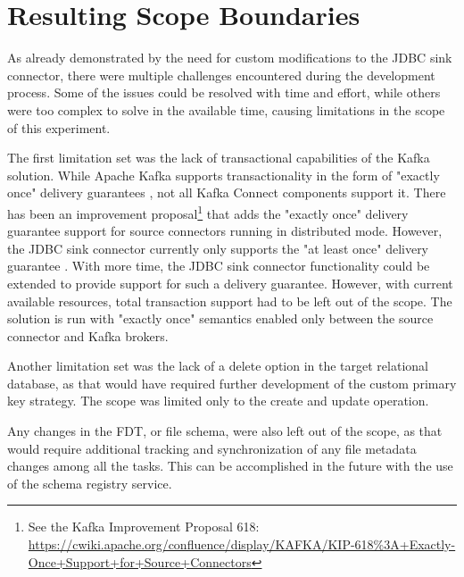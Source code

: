 
\section{Resulting Scope Boundaries}
\label{ch04:pipelinedevelopment:solutionlimitations}
As already demonstrated by the need for custom modifications to the \ac{JDBC} sink connector, there were multiple challenges encountered during the development process. Some of the issues could be resolved with time and effort, while others were too complex to solve in the available time, causing limitations in the scope of this experiment.

The first limitation set was the lack of transactional capabilities of the Kafka solution. While Apache Kafka supports transactionality in the form of "exactly once" delivery guarantees \cite{kafkadocumentation}, not all Kafka Connect components support it. There has been an improvement proposal\footnote{See the Kafka Improvement Proposal 618: \url{https://cwiki.apache.org/confluence/display/KAFKA/KIP-618\%3A+Exactly-Once+Support+for+Source+Connectors}} that adds the "exactly once" delivery guarantee support for source connectors running in distributed mode. However, the \ac{JDBC} sink connector currently only supports the "at least once" delivery guarantee \cite{jdbcsinkdocumentation}. With more time, the \ac{JDBC} sink connector functionality could be extended to provide support for such a delivery guarantee. However, with current available resources, total transaction support had to be left out of the scope. The solution is run with "exactly once" semantics enabled only between the source connector and Kafka brokers.

Another limitation set was the lack of a delete option in the target relational database, as that would have required further development of the custom primary key strategy. The scope was limited only to the create and update operation.

Any changes in the \ac{FDT}, or file schema, were also left out of the scope, as that would require additional tracking and synchronization of any file metadata changes among all the tasks. This can be accomplished in the future with the use of the schema registry service.

